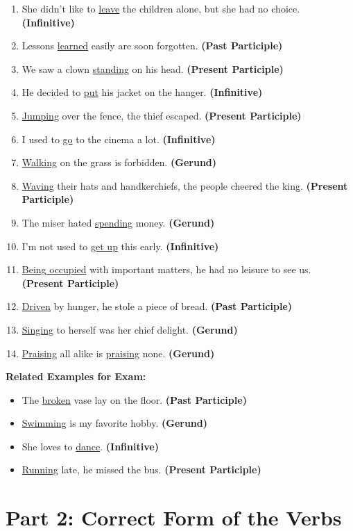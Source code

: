 \documentclass{article}
\begin{document}
\begin{enumerate}
    \item She didn't like to \underline{leave} the children alone, but she had no choice. \textbf{(Infinitive)}
    \item Lessons \underline{learned} easily are soon forgotten. \textbf{(Past Participle)}
    \item We saw a clown \underline{standing} on his head. \textbf{(Present Participle)}
    \item He decided to \underline{put} his jacket on the hanger. \textbf{(Infinitive)}
    \item \underline{Jumping} over the fence, the thief escaped. \textbf{(Present Participle)}
    \item I used to \underline{go} to the cinema a lot. \textbf{(Infinitive)}
    \item \underline{Walking} on the grass is forbidden. \textbf{(Gerund)}
    \item \underline{Waving} their hats and handkerchiefs, the people cheered the king. \textbf{(Present Participle)}
    \item The miser hated \underline{spending} money. \textbf{(Gerund)}
    \item I'm not used to \underline{get up} this early. \textbf{(Infinitive)}
    \item \underline{Being occupied} with important matters, he had no leisure to see us. \textbf{(Present Participle)}
    \item \underline{Driven} by hunger, he stole a piece of bread. \textbf{(Past Participle)}
    \item \underline{Singing} to herself was her chief delight. \textbf{(Gerund)}
    \item \underline{Praising} all alike is \underline{praising} none. \textbf{(Gerund)}
\end{enumerate}

\textbf{Related Examples for Exam:}
\begin{itemize}
    \item The \underline{broken} vase lay on the floor. \textbf{(Past Participle)}
    \item \underline{Swimming} is my favorite hobby. \textbf{(Gerund)}
    \item She loves to \underline{dance}. \textbf{(Infinitive)}
    \item \underline{Running} late, he missed the bus. \textbf{(Present Participle)}
\end{itemize}

\section*{Part 2: Correct Form of the Verbs}
\end{document}
